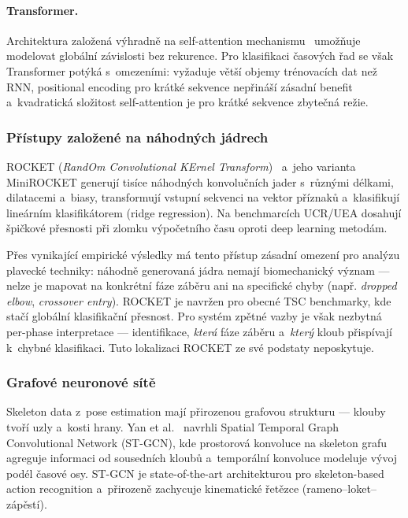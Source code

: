 \paragraph{Transformer.}
Architektura založená výhradně na self-attention mechanismu~\cite{vaswani2017attention} umožňuje modelovat globální závislosti bez rekurence. Pro klasifikaci časových řad se však Transformer potýká s~omezeními: vyžaduje větší objemy trénovacích dat než RNN, positional encoding pro krátké sekvence nepřináší zásadní benefit a~kvadratická složitost self-attention je pro krátké sekvence zbytečná režie.

\subsubsection{Přístupy založené na náhodných jádrech}
\label{subsubsec:rocket}

ROCKET (\textit{RandOm Convolutional KErnel Transform})~\cite{dempster2020rocket} a~jeho varianta MiniROCKET generují tisíce náhodných konvolučních jader s~různými délkami, dilatacemi a~biasy, transformují vstupní sekvenci na vektor příznaků a~klasifikují lineárním klasifikátorem (ridge regression). Na benchmarcích UCR/UEA dosahují špičkové přesnosti při zlomku výpočetního času oproti deep learning metodám.

Přes vynikající empirické výsledky má tento přístup zásadní omezení pro analýzu plavecké techniky: náhodně generovaná jádra nemají biomechanický význam --- nelze je mapovat na konkrétní fáze záběru ani na specifické chyby (např. \textit{dropped elbow}, \textit{crossover entry}). ROCKET je navržen pro obecné TSC benchmarky, kde stačí globální klasifikační přesnost. Pro systém zpětné vazby je však nezbytná per-phase interpretace --- identifikace, \emph{která} fáze záběru a~\emph{který} kloub přispívají k~chybné klasifikaci. Tuto lokalizaci ROCKET ze své podstaty neposkytuje.

\subsubsection{Grafové neuronové sítě}
\label{subsubsec:gnn}

Skeleton data z~pose estimation mají přirozenou grafovou strukturu --- klouby tvoří uzly a~kosti hrany. Yan et al.~\cite{yan2018stgcn} navrhli Spatial Temporal Graph Convolutional Network (ST-GCN), kde prostorová konvoluce na skeleton grafu agreguje informaci od sousedních kloubů a~temporální konvoluce modeluje vývoj podél časové osy. ST-GCN je state-of-the-art architekturou pro skeleton-based action recognition a~přirozeně zachycuje kinematické řetězce (rameno--loket--zápěstí).

